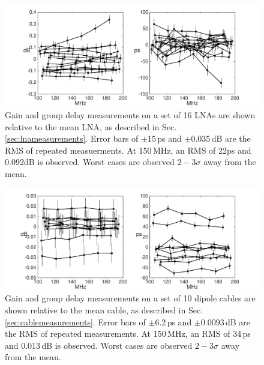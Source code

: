 \begin{figure}[h]
\centering
\includegraphics[width=6in]{chap2_beamforming_errors/lnas_gains_delays-eps-converted-to.pdf}
\caption[Gain and group delay measurements on a set of 16 LNAs are shown relative to the mean LNA.]{Gain and group delay measurements on a set of 16 LNAs are shown relative to the mean LNA, as described in Sec. \ref{sec:lnameasurements}. Error bars of $\pm15$\,ps and $\pm0.035$\,dB are the RMS of repeated measuerments. At 150\,MHz, an RMS of 22ps and 0.092dB is observed. Worst cases are observed $2-3\sigma$ away from the mean.}
\label{fig:lnasplot}
\end{figure}

\begin{figure}[h]
\centering
\includegraphics[width=6in]{chap2_beamforming_errors/cables_gains_delays-eps-converted-to.pdf}
\caption[Gain and group delay measurements on a set of 10 dipole cables are shown relative to the mean cable.]{Gain and group delay measurements on a set of 10 dipole cables are shown relative to the mean cable, as described in Sec. \ref{sec:cablemeasurements}. Error bars of $\pm6.2$\,ps and $\pm0.0093$\,dB are the RMS of repeated measurements. At 150\,MHz, an RMS of 34\,ps and 0.013\,dB is observed. Worst cases are observed $2-3\sigma$ away from the mean.}
\label{fig:cablesplot}
\end{figure}

